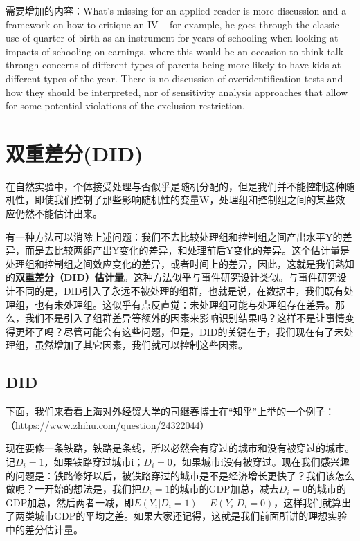 \documentclass[cn,12pt,math=newtx,citestyle=gb7714-2015,bibstyle=gb7714-2015]{elegantbook}
\begin{document}
	
需要增加的内容：What’s missing for an applied reader is more discussion and a framework on how to critique an IV – for example, he goes through the classic use of quarter of birth as an instrument for years of schooling when looking at impacts of schooling on earnings, where this would be an occasion to think talk through concerns of different types of parents being more likely to have kids at different types of the year. There is no discussion of overidentification tests and how they should be interpreted, nor of sensitivity analysis approaches that allow for some potential violations of the exclusion restriction.
	
	
	

	
	
	
	
	
	\chapter{双重差分(DID)}
	
	在自然实验中，个体接受处理与否似乎是随机分配的，但是我们并不能控制这种随机性，即使我们控制了那些影响随机性的变量W，处理组和控制组之间的某些效应仍然不能估计出来。
	
	有一种方法可以消除上述问题：我们不去比较处理组和控制组之间产出水平Y的差异，而是去比较两组产出Y变化的差异，和处理前后Y变化的差异。这个估计量是处理组和控制组之间效应变化的差异，或者时间上的差异，因此，这就是我们熟知的\textbf{双重差分（DID）估计量}。这种方法似乎与事件研究设计类似。与事件研究设计不同的是，DID引入了永远不被处理的组群，也就是说，在数据中，我们既有处理组，也有未处理组。这似乎有点反直觉：未处理组可能与处理组存在差异。那么，我们不是引入了组群差异等额外的因素来影响识别结果吗？这样不是让事情变得更坏了吗？尽管可能会有这些问题，但是，DID的关键在于，我们现在有了未处理组，虽然增加了其它因素，我们就可以控制这些因素。
	
	\section{DID}
	
	下面，我们来看看上海对外经贸大学的司继春博士在“知乎”上举的一个例子：（\url{https://www.zhihu.com/question/24322044}）
	
	现在要修一条铁路，铁路是条线，所以必然会有穿过的城市和没有被穿过的城市。记$D_i=1$，如果铁路穿过城市i；$D_i=0$，如果城市i没有被穿过。现在我们感兴趣的问题是：铁路修好以后，被铁路穿过的城市是不是经济增长更快了？我们该怎么做呢？一开始的想法是，我们把$D_i=1$的城市的GDP加总，减去$D_i=0$的城市的GDP加总，然后两者一减，即$E(Y_i\big|D_i=1)-E(Y_i\big|D_i=0)$，这样我们就算出了两类城市GDP的平均之差。如果大家还记得，这就是我们前面所讲的理想实验中的差分估计量。
	
\end{document}
